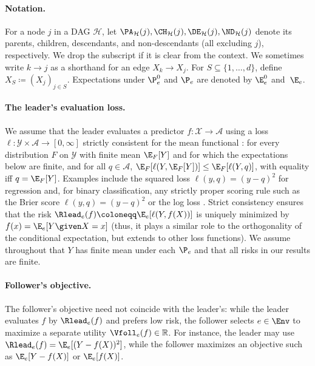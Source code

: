 \paragraph{Notation.}
For a node $j$ in a DAG $\mathcal{H}$, let $\PA_{\mathcal{H}}(j), \CH_{\mathcal{H}}(j), \DE_{\mathcal{H}}(j), \ND_{\mathcal{H}}(j)$ denote its parents, children, descendants, and non-descendants (all excluding $j$), respectively. We drop the subscript if it is clear from the context. 
We sometimes write $k \to j$ as a shorthand for an edge $X_k \to X_j$. For
$S \subseteq \{1, \ldots, d\}$, define $X_S \coloneqq (X_j)_{j \in S}$. Expectations under $\P^0_e$ and $\P_e$ are denoted by $\E^0_e$ and~$\E_e$.



\paragraph{The leader's evaluation loss.}
We assume that the leader evaluates a predictor $f \colon \mathcal{X} \to \mathcal{A}$
using a loss $\ell \colon \mathcal{Y} \times \mathcal{A} \to [0, \infty]$ strictly consistent for the mean functional \citep{gneitingMakingEvaluatingPoint2011}: for every distribution $F$ on $\mathcal{Y}$ with finite mean $\E_F[Y]$ and for which the expectations below are finite, and for all $q \in \mathcal{A}$, $\E_F[\ell(Y, \E_F[Y])] \leq \E_F[\ell(Y, q)]$, with equality iff $q = \E_F[Y]$. Examples include the squared loss $\ell(y, q) = (y-q)^2$ for regression and, for binary classification, any strictly proper scoring rule such as the
Brier score $\ell(y, q) = (y-q)^2$ or the
log loss \citep{gneitingStrictlyProperScoring2007}. Strict consistency ensures that the risk $\Rlead_e(f) \coloneqq \E_e[\ell(Y, f(X))]$ is uniquely minimized by $f(x) = \E_e[Y \given X = x]$ (thus, it plays a similar role to the orthogonality of the conditional expectation, but extends to other loss functions). We assume throughout that $Y$ has finite mean under each $\P_e$ and that all risks in our results are finite.




\paragraph{Follower's objective.}
The follower's objective need not coincide with the leader's: while the
leader evaluates $f$ by $\Rlead_e(f)$ and prefers low risk, the follower selects $e \in \Env$ to maximize a separate utility $\Vfoll_e(f) \in \mathbb{R}$. For instance, the leader may use $\Rlead_e(f) = \E_e[(Y-f(X))^2]$, while the follower maximizes an objective such as $\E_e[Y - f(X)]$ or $\E_e[f(X)]$.




